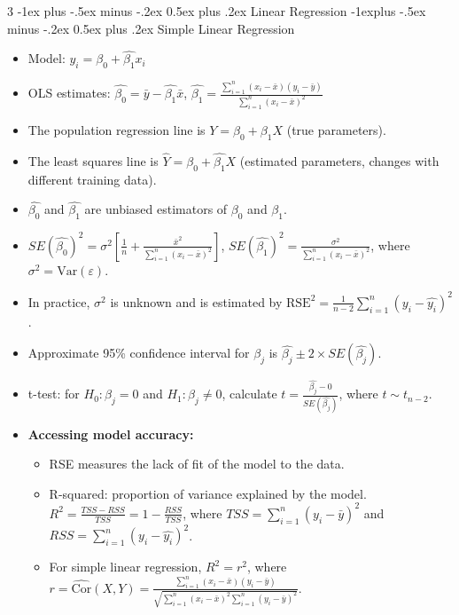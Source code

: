 \documentclass[10pt, landscape]{article}
\makeatletter
\renewcommand{\section}{\@startsection{section}{1}{0mm}%
  {-1ex plus -.5ex minus -.2ex}%
  {0.5ex plus .2ex}%
{\normalfont\large\bfseries}}
\renewcommand{\subsection}{\@startsection{subsection}{2}{0mm}%
  {-1explus -.5ex minus -.2ex}%
  {0.5ex plus .2ex}%
{\normalfont\normalsize\bfseries}}
\newcommand{\eps}{\varepsilon}
\makeatother
\begin{document}
\begin{multicols*}{3}
    \section{Linear Regression}
    \subsection{Simple Linear Regression}
    \begin{itemize}
      \item Model: $\hat{y_i} = \hat{\beta_0} + \hat{\beta_1}x_i $
      \item OLS estimates: $\hat{\beta_0} = \bar{y} - \hat{\beta_1}\bar{x}$, $\hat{\beta_1} = \frac{\sum_{i=1}^n (x_i - \bar{x})(y_i - \bar{y})}{\sum_{i=1}^n (x_i - \bar{x})^2}$
      \item The population regression line is $Y = \beta_0 + \beta_1X$ (true parameters).
      \item The least squares line is $\hat{Y} = \hat{\beta_0} + \hat{\beta_1}X$ (estimated parameters, changes with different training data).
      \item $\hat{\beta_0}$ and $\hat{\beta_1}$ are unbiased estimators of $\beta_0$ and $\beta_1$.
      \item $SE(\hat{\beta_0})^2 = \sigma^2 \left[ \frac{1}{n} + \frac{\bar{x}^2}{\sum_{i=1}^n (x_i - \bar{x})^2} \right]$, $SE(\hat{\beta_1})^2 = \frac{\sigma^2}{\sum_{i=1}^n (x_i - \bar{x})^2}$, where $\sigma^2 = \text{Var}(\eps)$.
      \item In practice, $\sigma^2$ is unknown and is estimated by $\text{RSE}^2 = \frac{1}{n-2} \sum_{i=1}^n (y_i - \hat{y_i})^2$.
      \item Approximate 95\% confidence interval for $\beta_j$ is $\hat{\beta_j} \pm 2 \times SE(\hat{\beta_j})$.
      \item t-test: for $H_0: \beta_j = 0$ and $H_1: \beta_j \neq 0$, calculate $t = \frac{\hat{\beta_j} - 0}{SE(\hat{\beta_j})}$, where $t \sim t_{n-2}$.
      \item \textbf{Accessing model accuracy:}
      \begin{itemize}
        \item RSE measures the lack of fit of the model to the data.
        \item {R-squared:} proportion of variance explained by the model. $R^2 = \frac{TSS - RSS}{TSS} = 1 - \frac{RSS}{TSS}$, where $TSS = \sum_{i=1}^n (y_i - \bar{y})^2$ and $RSS = \sum_{i=1}^n (y_i - \hat{y_i})^2$.
        \item For simple linear regression, $R^2 = r^2$, where $r = \hat{\text{Cor}}(X,Y) = \frac{\sum_{i=1}^n (x_i - \bar{x})(y_i - \bar{y})}{\sqrt{\sum_{i=1}^n (x_i - \bar{x})^2 \sum_{i=1}^n (y_i - \bar{y})^2}}$.
      \end{itemize}
    \end{itemize}


\end{multicols*}
\end{document}
